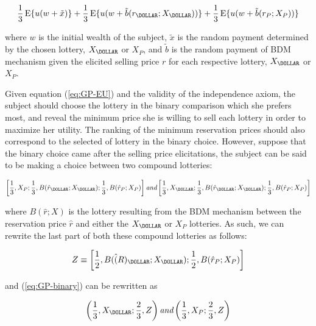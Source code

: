 \documentclass[11pt,a4paper]{report}
\newcommand{\E}{\operatorname{E}}           %
\begin{document}
\begin{equation}
	\label{eq:GP-EU}
	\frac{1}{3}\E\lbrace u (w+\tilde{x})\rbrace  + \frac{1}{3}\E\lbrace u (w+\tilde{b}(r_\DOLLAR ;X_\DOLLAR ))\rbrace + \frac{1}{3}\E\lbrace u (w+\tilde{b}(r_P;X_P))\rbrace
\end{equation}

\noindent where $w$ is the initial wealth of the subject, $\tilde{x}$ is the random payment determined by the chosen lottery, $X_\DOLLAR $ or $X_P$, and $\tilde{b}$ is the random payment of BDM mechanism given the elicited selling price $r$ for each respective lottery, $X_\DOLLAR $ or $X_P$.

Given equation (\ref{eq:GP-EU}) and the validity of the independence axiom, the subject should choose the lottery in the binary comparison which she prefers most, and reveal the minimum price she is willing to sell each lottery in order to maximize her utility.
The ranking of the minimum reservation prices should also correspond to the selected of lottery in the binary choice.
However, suppose that the binary choice came after the selling price elicitations, the subject can be said to be making a choice between two compound lotteries:

\begin{equation}
	\label{eq:GP-binary}
	\left[ \frac{1}{3},X_P;\frac{1}{3},B(\hat{r}_\DOLLAR  ; X_\DOLLAR ) ; \frac{1}{3}, B(\hat{r}_P ; X_P)\right]   \textit{and}   \left[ \frac{1}{3},X_\DOLLAR ;\frac{1}{3},B(\hat{r}_\DOLLAR  ; X_\DOLLAR ) ; \frac{1}{3}, B(\hat{r}_P ; X_P) \right]
\end{equation}

\noindent where $B(\hat{r};X)$ is the lottery resulting from the BDM mechanism between the reservation price $\hat{r}$ and either the $X_\DOLLAR $ or $X_P$ lotteries.
As such, we can rewrite the last part of both these compound lotteries as follows:

\begin{equation}
	Z \equiv \left[ \frac{1}{2}, B(\hat(R)_\DOLLAR ;X_\DOLLAR )  ; \frac{1}{2},B(\hat{r}_P ; X_P)  \right]
\end{equation}

\noindent and (\ref{eq:GP-binary}) can be rewritten as

\begin{equation}
	\label{eq:GP-bin-reduced}
	\left( \frac{1}{3}, X_\DOLLAR  ; \frac{2}{3},Z \right) \textit{and} \left( \frac{1}{3},X_P ; \frac{2}{3},Z  \right)
\end{equation}
\end{document}
